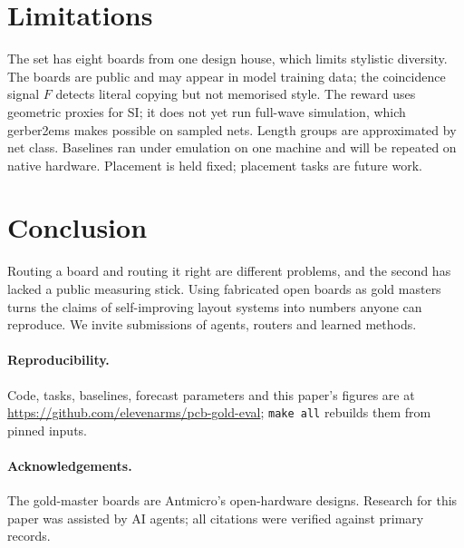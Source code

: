 \documentclass[11pt]{article}
\begin{document}
\section{Limitations}
The set has eight boards from one design house, which limits stylistic diversity. The boards are public and may appear in model training data; the coincidence signal $F$ detects literal copying but not memorised style. The reward uses geometric proxies for SI; it does not yet run full-wave simulation, which gerber2ems makes possible on sampled nets. Length groups are approximated by net class. Baselines ran under emulation on one machine and will be repeated on native hardware. Placement is held fixed; placement tasks are future work.

\section{Conclusion}
Routing a board and routing it right are different problems, and the second has lacked a public measuring stick. Using fabricated open boards as gold masters turns the claims of self-improving layout systems into numbers anyone can reproduce. We invite submissions of agents, routers and learned methods.

\paragraph{Reproducibility.} Code, tasks, baselines, forecast parameters and this paper's figures are at \url{https://github.com/elevenarms/pcb-gold-eval}; \texttt{make all} rebuilds them from pinned inputs.

\paragraph{Acknowledgements.} The gold-master boards are Antmicro's open-hardware designs. Research for this paper was assisted by AI agents; all citations were verified against primary records.



\end{document}
